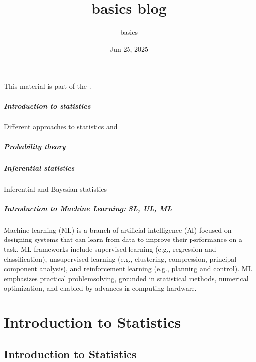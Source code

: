 \documentclass[letterpaper,10pt,english]{jupyterBook}
\title{basics blog}
\date{Jun 25, 2025}
\author{basics}
\begin{document}
\pagestyle{empty}
\sphinxmaketitle
\pagestyle{plain}
\sphinxtableofcontents
\pagestyle{normal}
\label{\detokenize{intro::doc}}


\sphinxAtStartPar
This material is part of the .

\sphinxAtStartPar
{}
\subsubsection*{Introduction to statistics}

\sphinxAtStartPar
Different approaches to statistics and 
\subsubsection*{Probability theory}
\subsubsection*{Inferential statistics}

\sphinxAtStartPar
Inferential and Bayesian statistics
\subsubsection*{Introduction to Machine Learning: SL, UL, ML}

\sphinxAtStartPar
Machine learning (ML) is a branch of artificial intelligence (AI) focused on designing systems that can learn from data to improve their performance on a task. ML frameworks include supervised learning (e.g., regression and classification), unsupervised learning (e.g., clustering, compression, principal component analysis), and reinforcement learning (e.g., planning and control). ML emphasizes practical problem\sphinxhyphen{}solving, grounded in statistical methods, numerical optimization, and enabled by advances in computing hardware.





\sphinxstepscope


\part{Introduction to Statistics}

\sphinxstepscope


\chapter{Introduction to Statistics}
\label{\detokenize{ch/intro/intro:introduction-to-statistics}}\label{\detokenize{ch/intro/intro:intro}}\label{\detokenize{ch/intro/intro::doc}}
\sphinxstepscope
\end{document}
